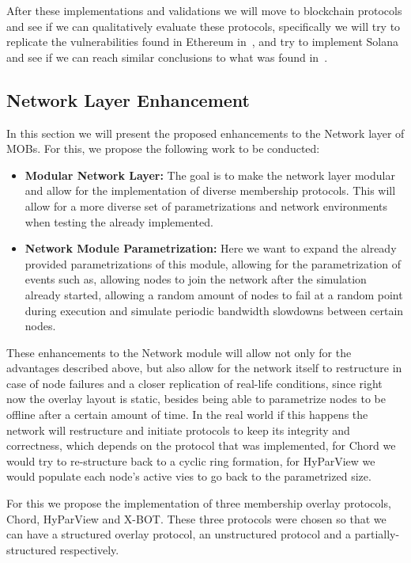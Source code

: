After these implementations and validations we will move to blockchain protocols and see
if we can qualitatively evaluate these protocols, specifically we will try to
replicate the vulnerabilities found in Ethereum in~\cite{ethereum_analysis}, and try
to implement Solana and see if we can reach similar conclusions to what was found in~\cite{solana_halting_problem}.

\subsection{Network Layer Enhancement}\label{subsec:network_layer_enchancement}

In this section we will present the proposed enhancements to the Network layer of
MOBs. For this, we propose the following work to be conducted:

\begin{itemize}
  \item \textbf{Modular Network Layer:} The goal is to make the network layer
modular and allow for the implementation of diverse membership protocols. This
will allow for a more diverse set of parametrizations and network environments
when testing the already implemented.
  \item \textbf{Network Module Parametrization:} Here we want to expand the already
provided parametrizations of this module, allowing for the parametrization of events
such as, allowing nodes to join the network after the simulation already started,
allowing a random amount of nodes to fail at a random point during execution and
simulate periodic bandwidth slowdowns between certain nodes.
\end{itemize}

These enhancements to the Network module will allow not only for the advantages
described above, but also allow for the network itself to restructure in case of
node failures and a closer replication of real-life conditions, since right now the
overlay layout is static, besides being able to parametrize nodes to be offline after
a certain amount of time. In the real world if this happens the network will restructure
and initiate protocols to keep its integrity and correctness, which depends on the
protocol that was implemented, for Chord we would try to re-structure back to a cyclic
ring formation, for HyParView we would populate each node's active vies to go back to the
parametrized size.

For this we propose the implementation of three membership overlay protocols, Chord,
HyParView and X-BOT. These three protocols were chosen so that we can have a
structured overlay protocol, an unstructured protocol and a partially-structured
respectively.


